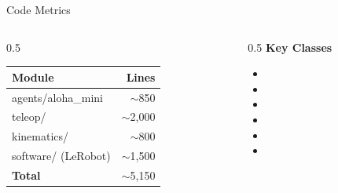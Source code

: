 \begin{frame}{Code Metrics}
\begin{columns}
\begin{column}{0.5\textwidth}
    \begin{table}
    \centering
    \begin{tabular}{lr}
    \toprule
    \textbf{Module} & \textbf{Lines} \\
    \midrule
    agents/aloha\_mini & $\sim$850 \\
    teleop/ & $\sim$2,000 \\
    kinematics/ & $\sim$800 \\
    software/ (LeRobot) & $\sim$1,500 \\
    \midrule
    \textbf{Total} & $\sim$5,150 \\
    \bottomrule
    \end{tabular}
    \end{table}
\end{column}
\begin{column}{0.5\textwidth}
    \textbf{Key Classes}
    \begin{itemize}
        \item {}
        \item {}
        \item {}
        \item {}
        \item {}
        \item {}
    \end{itemize}
\end{column}
\end{columns}
\end{frame}
